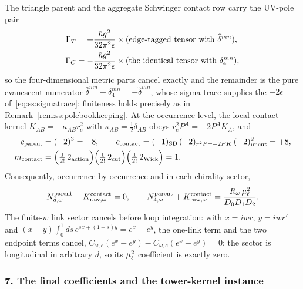The triangle parent and the aggregate Schwinger contact row carry the UV-pole
pair
\begin{align}
\Gamma_{T}&=+\frac{\hbar g^{2}}{32\pi^{2}\epsilon}\times(\text{edge-tagged
tensor with }\widehat\delta^{mn}),\notag\\
\Gamma_{C}&=-\frac{\hbar g^{2}}{32\pi^{2}\epsilon}\times(\text{the identical
tensor with }\delta_{4}^{mn}),
\label{eq:ss:ad-polepair}
\end{align}
so the four-dimensional metric parts cancel exactly and the remainder is the
pure evanescent numerator $\widehat\delta^{mn}-\delta_{4}^{mn}
=-\breve\delta^{mn}$, whose sigma-trace supplies the $-2\epsilon$
of~\eqref{eq:ss:sigmatrace}: finiteness holds precisely as in
Remark~\ref{rem:ss:polebookkeeping}. At the occurrence level, the local
contact kernel $K_{AB}=-\kappa_{AB}r_{e}^{2}$ with
$\kappa_{AB}=\tfrac12\delta_{AB}$ obeys $r_{e}^{2}P^{A}=-2P^{A}K_{A}$, and
\begin{align}
c_{\mathrm{parent}}&=(-2)^{3}=-8,
\qquad
c_{\mathrm{contact}}
=(-1)_{\mathrm{SD}}\,(-2)_{r^{2}P=-2PK}\,(-2)^{2}_{\mathrm{uncut}}=+8,\notag\\
m_{\mathrm{contact}}
&=\Big(\tfrac{1}{2!}\,2_{\mathrm{action}}\Big)
\Big(\tfrac{1}{2!}\,2_{\mathrm{cut}}\Big)
\Big(\tfrac{1}{2!}\,2_{\mathrm{Wick}}\Big)=1 .
\label{eq:ss:ad-signs}
\end{align}
Consequently, occurrence by occurrence and in each chirality sector,
\begin{equation}\label{eq:ss:ad-occcancel}
N^{\mathrm{parent}}_{d,\omega}+K^{\mathrm{contact}}_{\mathrm{raw},\omega}=0,
\qquad
N^{\mathrm{parent}}_{4,\omega}+K^{\mathrm{contact}}_{\mathrm{raw},\omega}
=\frac{R_{\omega}\,\mu_\ell^{2}}{D_{0}D_{1}D_{2}} .
\end{equation}
The finite-$w$ link sector cancels before loop integration: with $x=iwr$,
$y=iwr'$ and $(x-y)\int_{0}^{1}ds\,e^{sx+(1-s)y}=e^{x}-e^{y}$, the one-link
term and the two endpoint terms cancel,
$C_{\omega,e}(e^{x}-e^{y})-C_{\omega,e}(e^{x}-e^{y})=0$; the sector is
longitudinal in arbitrary $d$, so its $\mu_\ell^{2}$ coefficient is exactly zero.

\subsubsection*{7. The final coefficients and the tower-kernel instance}

